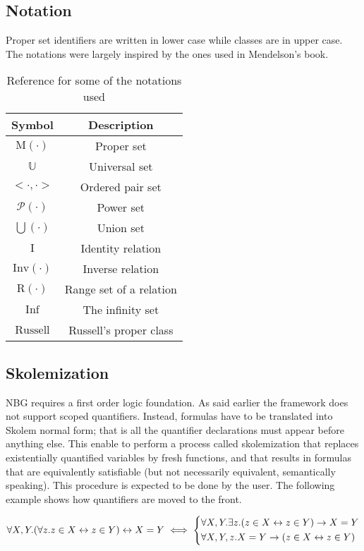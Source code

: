 \documentclass[acmlarge]{acmart}
\begin{document}
\subsection{Notation}

Proper set identifiers are written in lower case while classes are in upper case. The notations were largely inspired by the ones used in Mendelson's book.

\begin{table}[h!]
\centering
\begin{tabular}{|| c | c ||}
 \hline
 Symbol & Description \\ [0.5ex]
 \hline\hline
 $\text{M}(\cdot)$ & Proper set \\
 $\mathbb{U}$ & Universal set \\
 $<\cdot, \cdot>$ & Ordered pair set \\
 $\mathcal{P}(\cdot)$ & Power set \\
 $\bigcup(\cdot)$ & Union set \\
 $\text{I}$ & Identity relation \\
 $\text{Inv}(\cdot)$ & Inverse relation \\
 $\text{R}(\cdot)$ & Range set of a relation \\
 $\text{Inf}$ & The infinity set \\
 $\text{Russell}$ & Russell's proper class \\
 \hline
\end{tabular}
\caption{Reference for some of the notations used}
\label{table:1}
\end{table}

\subsection{Skolemization}

NBG requires a first order logic foundation. As said earlier the framework does not support scoped quantifiers. Instead, formulas have to be translated into Skolem normal form; that is all the quantifier declarations must appear before anything else. This enable to perform a process called skolemization that replaces existentially quantified variables by fresh functions, and that results in formulas that are equivalently satisfiable (but not necessarily equivalent, semantically speaking). This procedure is expected to be done by the user. The following example shows how quantifiers are moved to the front.

\[
\forall X, Y. (\forall z. z \in X \leftrightarrow z \in Y) \leftrightarrow X = Y \iff
\begin{dcases*}
\forall X, Y. \exists z. (z \in X \leftrightarrow z \in Y) \rightarrow X = Y \\
\forall X, Y, z. X = Y \rightarrow (z \in X \leftrightarrow z \in Y)
\end{dcases*}
\]
\end{document}
